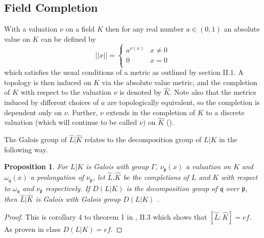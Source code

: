 \documentclass[paper=a4, fontsize=11pt]{scrartcl} %
\numberwithin{equation}{section} %
\numberwithin{figure}{section} %
\numberwithin{table}{section} %
\theoremstyle{break}
\newtheorem{prop}{Proposition}
\begin{document}
\subsection{Field Completion}
With a valuation $\nu$ on a field $K$ then for any real number $a\in(0,1)$ an absolute value on $K$ can be defined by
\[ ||x|| =  \begin{cases} 
      a^{\nu(x)} & x \not= 0 \\
      0 & x = 0 \\
   \end{cases}
\]
which satisfies the usual conditions of a metric as outlined by \cite{Serre} section II.1. A topology is then induced on $K$ via the absolute value metric, and the completion of $K$ with respect to the valuation $\nu$ is denoted by $\widehat{K}$. Note also that the metrics induced by different choices of $a$ are topologically equivalent, so the completion is dependent only on $\nu$. Further, $\nu$ extends in the completion of $K$ to a discrete valuation (which will continue to be called $\nu$) on $\widehat{K}$ (\cite{Serre}).

The Galois group of $\widehat{L}|\widehat{K}$ relates to the decomposition group of $L|K$ in the following way.
\begin{prop}
For $L|K$ is Galois with group $\Gamma$, $\nu_\mathfrak{p}(x)$ a valuation on $K$ and $\omega_\mathfrak{q}(x)$ a prolongation of $\nu_\mathfrak{p}$, let $\widehat{L}$,$\widehat{K}$ be the completions of $L$ and $K$ with respect to $\omega_\mathfrak{q}$ and $\nu_\mathfrak{p}$ respectively. If $D(L|K)$ is the decomposition group of $\mathfrak{q}$ over $\mathfrak{p}$, then $\widehat{L}|\widehat{K}$ is Galois with Galois group $D(L|K)$ \cite{Serre}.
\end{prop}
\begin{proof}
This is corollary 4 to theorem 1 in \cite{Serre}, II.3 which shows that $[\widehat{L}:\widehat{K}]=ef$. As proven in class $D(L|K)=ef$.
\end{proof}
\end{document}
